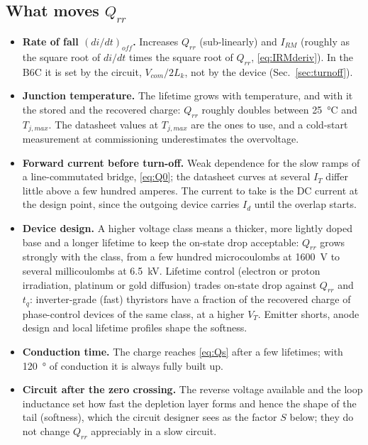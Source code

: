 \documentclass[10pt,a4paper]{scrartcl}
\newcommand{\Id}{I_{d}}
\newcommand{\Lk}{L_{k}}
\begin{document}
\subsection{What moves \texorpdfstring{$Q_{rr}$}{Qrr}}
\begin{itemize}[leftmargin=*]
\item \textbf{Rate of fall $(di/dt)_{off}$.} Increases $Q_{rr}$ (sub-linearly) and $I_{RM}$ (roughly as the square root of $di/dt$ times the square root of $Q_{rr}$, \eqref{eq:IRMderiv}). In the B6C it is set by the circuit, $V_{com}/2\Lk$, not by the device (Sec.~\ref{sec:turnoff}).
\item \textbf{Junction temperature.} The lifetime grows with temperature, and with it the stored and the recovered charge: $Q_{rr}$ roughly doubles between \SI{25}{\celsius} and $T_{j,max}$. The datasheet values at $T_{j,max}$ are the ones to use, and a cold-start measurement at commissioning underestimates the overvoltage.
\item \textbf{Forward current before turn-off.} Weak dependence for the slow ramps of a line-commutated bridge, \eqref{eq:Q0}; the datasheet curves at several $I_T$ differ little above a few hundred amperes. The current to take is the DC current at the design point, since the outgoing device carries $\Id$ until the overlap starts.
\item \textbf{Device design.} A higher voltage class means a thicker, more lightly doped base and a longer lifetime to keep the on-state drop acceptable: $Q_{rr}$ grows strongly with the class, from a few hundred microcoulombs at \SI{1600}{V} to several millicoulombs at \SI{6.5}{kV}. Lifetime control (electron or proton irradiation, platinum or gold diffusion) trades on-state drop against $Q_{rr}$ and $t_q$: inverter-grade (fast) thyristors have a fraction of the recovered charge of phase-control devices of the same class, at a higher $V_T$. Emitter shorts, anode design and local lifetime profiles shape the softness.
\item \textbf{Conduction time.} The charge reaches \eqref{eq:Qs} after a few lifetimes; with \SI{120}{\degree} of conduction it is always fully built up.
\item \textbf{Circuit after the zero crossing.} The reverse voltage available and the loop inductance set how fast the depletion layer forms and hence the shape of the tail (softness), which the circuit designer sees as the factor $S$ below; they do not change $Q_{rr}$ appreciably in a slow circuit.
\end{itemize}
\end{document}
